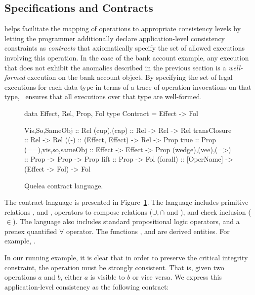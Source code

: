 \subsection{Specifications and Contracts}

\name helps facilitate the mapping of operations to appropriate consistency
levels by letting the programmer additionally declare application-level consistency
constraints as \emph{contracts} that axiomatically specify the set of allowed
executions involving this operation.  In the case of the bank account example,
any execution that does not exhibit the anomalies described in the previous
section is a \emph{well-formed} execution on the bank account object.  By
specifying the set of legal executions for each data type in terms of a trace
of operation invocations on that type, \name\ ensures that all executions over
that type are well-formed.

\begin{figure}
\begin{codehaskell}
data Effect, Rel, Prop, Fol
type Contract = Effect -> Fol

Vis,So,SameObj :: Rel
(cup),(cap)        :: Rel -> Rel -> Rel
transClosure   :: Rel -> Rel
((-)            :: (Effect, Effect) -> Rel -> Prop
true           :: Prop
(==),vis,so,sameObj :: Effect -> Effect -> Prop
(wedge),(vee),(=>)   :: Prop -> Prop -> Prop
lift           :: Prop -> Fol
(forall) :: [OperName] -> (Effect -> Fol) -> Fol
\end{codehaskell}
\caption{Quelea contract language.}
\label{code:ctrt_lang}
\end{figure}

\name The contract language is presented in Figure~\ref{code:ctrt_lang}. The
language includes primitive relations , and ,
operators to compose relations ($\cup,\cap$ and ), and check
inclusion ($\in$). The language also includes standard propositional logic
operators, and a prenex quantified $\forall$ operator. The functions ,
 and  are derived entities. For example, .

In our running example, it is clear that in order to preserve the critical
integrity constraint, the  operation must be strongly
consistent. That is, given two  operations $a$ and $b$, either
$a$ is visible to $b$ or vice versa. We express this application-level
consistency as the following contract:

